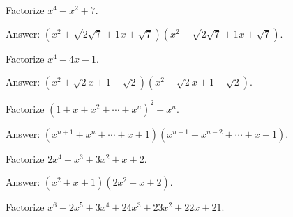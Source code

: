 \documentclass[12pt,a4paper]{memoir}
\theoremstyle{definition}
\begin{document}
\begin{tcolorbox}
	\begin{question}
		Factorize $x^4-x^2+7$.
	\end{question}
\end{tcolorbox}

\begin{solution}[name=Solution by Parviz Shahriari]
	Answer: $(x^2+\sqrt{2\sqrt{7}+1}x + \sqrt{7})(x^2-\sqrt{2\sqrt{7}+1}x + \sqrt{7})$.
\end{solution}


\begin{tcolorbox}
	\begin{question}
		Factorize $x^4+4x-1$.
	\end{question}
\end{tcolorbox}

\begin{solution}[name=Solution by Parviz Shahriari]
	Answer: $(x^2+\sqrt{2}x + 1 - \sqrt{2})(x^2 - \sqrt{2}x+1 + \sqrt{2})$.
\end{solution}


\begin{tcolorbox}
	\begin{question}
		Factorize $(1+x+x^2+\cdots+x^n)^2-x^n$.
	\end{question}
\end{tcolorbox}

\begin{solution}[name=Solution by Parviz Shahriari]
	Answer: $(x^{n+1}+x^n+\cdots+x+1)(x^{n-1}+x^{n-2}+\cdots+x+1)$.
\end{solution}


\begin{tcolorbox}
	\begin{question}
		Factorize $2x^4+x^3+3x^2+x+2$.
	\end{question}
\end{tcolorbox}

\begin{solution}[name=Solution by Parviz Shahriari]
	Answer: $(x^2+x+1)(2x^2-x+2)$.
\end{solution}



\begin{tcolorbox}
	\begin{question}
		Factorize $x^6+2x^5+3x^4+24x^3+23x^2+22x+21$.
	\end{question}
\end{tcolorbox}
\end{document}

